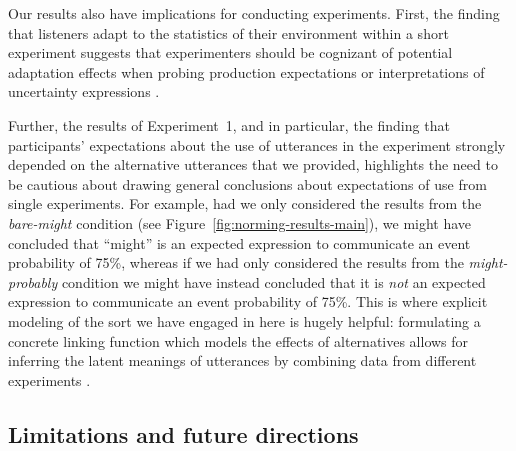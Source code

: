 \documentclass[man, floatsintext]{apa6}
\newcommand{\figref}[1]{Figure~\ref{#1}}
\providecommand{\DIFadd}[1]{{\protect\color{blue}\uwave{#1}}} %
\providecommand{\DIFaddbegin}{} %
\providecommand{\DIFaddend}{} %
\newcommand{\DIFaddincludegraphics}[2][]{{\color{blue}\fbox{\DIFOincludegraphics[#1]{#2}}}} %
\DeclareRobustCommand{\DIFaddbegin}{\DIFOaddbegin \let\includegraphics\DIFaddincludegraphics} %
\DeclareRobustCommand{\DIFaddend}{\DIFOaddend \let\includegraphics\DIFOincludegraphics} %
\begin{document}
Our results also have implications for conducting \DIFaddbegin \DIFadd{psycholinguistic }\DIFaddend experiments. First,
the finding that listeners adapt to the statistics of their environment within a short experiment
suggests that experimenters should be cognizant of potential adaptation effects when probing
production expectations or interpretations of uncertainty expressions \parencite[see also][]{Jaeger2010}. 

Further, the results of Experiment~1, and in particular, the finding
that participants' expectations about the use of utterances in the experiment strongly depended on
the alternative utterances that we provided, highlights the need to be cautious about drawing general conclusions about expectations of use from single experiments. For example,
had we only considered the results from the \textit{bare-might} condition (see \figref{fig:norming-results-main}),
we might have concluded that ``might'' is an expected expression to communicate an event probability of 75\%,
whereas if we had only considered the results from the \textit{might-probably} condition we might have instead concluded that it is \emph{not} an expected expression to communicate an event probability of 75\%.
This is where explicit modeling of the sort we have engaged in here is hugely helpful: formulating a concrete linking function which models the effects of 
alternatives allows for inferring the latent meanings of utterances by combining data from different experiments \parencite[see also][for similar approaches]{Franke2014,Peloquin2016}.

\subsection{Limitations and future directions}
\end{document}
